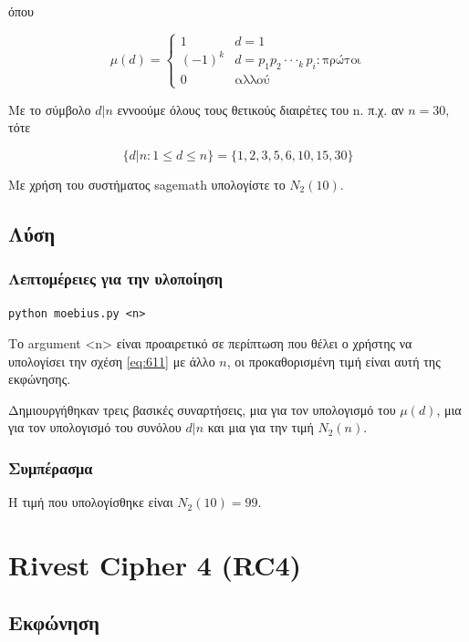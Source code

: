 \documentclass[oneside]{article}
\let\t\texttt
\begin{document}
όπου

\begin{equation}
    \mu(d) = 
    \begin{cases}
      1 & d = 1 \\
      (-1)^k & d = p_1p_2\cdot\cdot\cdotp_k p_i :\text{πρώτοι}\\
      0 & \text{αλλού}
    \end{cases}
\end{equation}

Με το σύμβολο $d|n$ εννοούμε όλους τους θετικούς διαιρέτες του n. π.χ. αν $n = 30$, τότε

\begin{equation}
    \{d|n: 1 \le d \le n\} = \{1, 2, 3, 5, 6, 10, 15, 30\}
\end{equation}

Με χρήση του συστήματος sagemath υπολογίστε το $N_2(10)$.

\subsection{Λύση} 

\subsubsection{Λεπτομέρειες για την υλοποίηση}

\begin{center}
    \t{python moebius.py <n>}
\end{center}

Το argument <n> είναι προαιρετικό σε περίπτωση που θέλει ο χρήστης να υπολογίσει την σχέση \ref{eq:611} με άλλο $n$, οι προκαθορισμένη τιμή είναι αυτή της εκφώνησης.

Δημιουργήθηκαν τρεις βασικές συναρτήσεις, μια για τον υπολογισμό του $μ(d)$, μια για τον υπολογισμό του συνόλου $d|n$ και μια για την τιμή $ N_2(n)$.

\subsubsection{Συμπέρασμα}

Η τιμή που υπολογίσθηκε είναι $N_2(10) = 99$.

\section{Rivest Cipher 4 (RC4)}

\subsection{Εκφώνηση}
\end{document}
